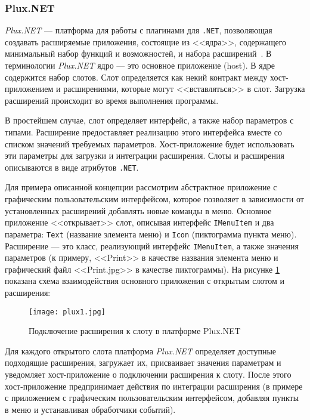 \subsubsection{Plux.NET}

{\it Plux.NET} --- платформа для работы с плагинами для {\tt .NET}, позволяющая создавать расширяемые приложения, состоящие из <<ядра>>, содержащего минимальный набор функций и возможностей, и набора расширений~\cite{plux-website}. В терминологии {\it Plux.NET} ядро --- это основное приложение (host). В ядре содержится набор слотов. Слот определяется как некий контракт между хост-приложением и расширениями, которые могут <<вставляться>> в слот. Загрузка расширений происходит во время выполнения программы. 

В простейшем случае, слот определяет интерфейс, а также набор параметров с типами. Расширение предоставляет реализацию этого интерфейса вместе со списком значений требуемых параметров. Хост-приложение  будет использовать эти параметры для загрузки и интеграции расширения. Слоты и расширения описываются в виде атрибутов {\tt .NET}.

Для примера описанной концепции рассмотрим абстрактное приложение с графическим пользовательским интерфейсом, которое позволяет в зависимости от установленных расширений добавлять новые команды в меню. Основное приложение <<открывает>> слот, описывая интерфейс {\tt IMenuItem} и два параметра: {\tt Text} (название элемента меню) и {\tt Icon} (пиктограмма пункта меню). Расширение --- это класс, реализующий интерфейс {\tt IMenuItem}, а также значения параметров (к примеру, <<Print>> в качестве названия элемента меню и графический файл <<Print.jpg>> в качестве пиктограммы). На рисунке \ref{plux-scheme} показана схема взаимодействия основного приложения с открытым слотом и расширения:

\begin{figure}[!h]
    \centering
    \texttt{[image: plux1.jpg]}
    \caption{Подключение расширения к слоту в платформе Plux.NET}
    \label{plux-scheme}
\end{figure}


Для каждого открытого слота платформа {\it Plux.NET} определяет доступные подходящие расширения, загружает их, присваивает значения параметрам и уведомляет хост-приложение о подключении расширения к слоту. После этого хост-приложение предпринимает действия по интеграции расширения (в примере с приложением с графическим пользовательским интерфейсом, добавляя пункты в меню и устанавливая обработчики событий).